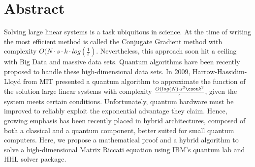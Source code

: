 \chapter*{Abstract}
Solving large linear systems is a task ubiquitous in science. At the time of writing the most efficient method is called the Conjugate Gradient method with complexity $O(N \cdot s \cdot k \cdot log(\frac{1}{\epsilon})$. Nevertheless, this approach soon hit a ceiling with Big Data and massive data sets. Quantum algorithms have been recently proposed to handle these high-dimensional data sets. In 2009, Harrow-Hassidim-Lloyd from MIT presented a quantum algorithm to approximate the function of the solution large linear systems with complexity $\frac{O(log(N) \cdot s^2 \csot k^2}{\epsilon}$, given the system meets certain conditions. Unfortunately, quantum hardware must be improved to reliably exploit the exponential advantage they claim. Hence, growing emphasis has been recently placed in hybrid architectures, composed of both a classical and a quantum component, better suited for small quantum computers. Here, we propose a mathematical proof and a hybrid algorithm to solve a high-dimensional Matrix Riccati equation using IBM's quantum lab and HHL solver package. 